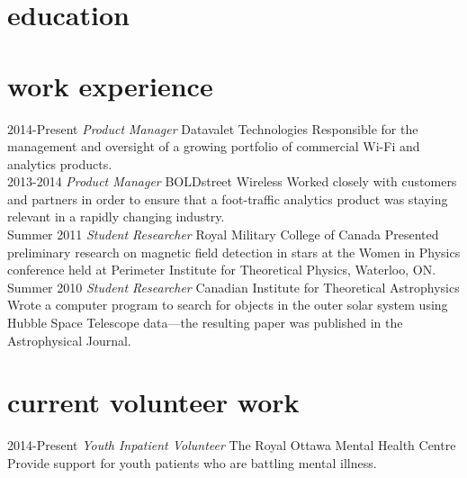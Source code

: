 \documentclass{cv}
\begin{document}
\section{education}
\begin{entrylist}
\end{entrylist}

\section{work experience}
\begin{entrylist}
  \entry
    {2014-Present}
    {\emph{Product Manager}}
    {Datavalet Technologies}
    {Responsible for the management and oversight of a growing portfolio of commercial Wi-Fi and analytics products.}\\
      \entry
    {2013-2014}
    {\emph{Product Manager}}
    {BOLDstreet Wireless}
    {Worked closely with customers and partners in order to ensure that a foot-traffic analytics product was staying relevant in a rapidly changing industry.}\\
  \entry
    {Summer 2011} 
   {\emph{Student Researcher}}
    {Royal Military College of Canada}
    {Presented preliminary research on magnetic field detection in stars at the Women in Physics conference held at Perimeter Institute for Theoretical Physics, Waterloo, ON. }\\
  \entry
    {Summer 2010}
    {\emph{Student Researcher}}
    {Canadian Institute for Theoretical Astrophysics}
    {Wrote a computer program to search for objects in the outer solar system using Hubble Space Telescope data---the resulting paper was published in the Astrophysical Journal.}
\end{entrylist}

\section{current volunteer work}
\begin{entrylist}
  \entry
    {2014-Present}
    {\emph{Youth Inpatient Volunteer}}
    {The Royal Ottawa Mental Health Centre}
    {Provide support for youth patients who are battling mental illness.}
    \end{entrylist}
\end{document}
